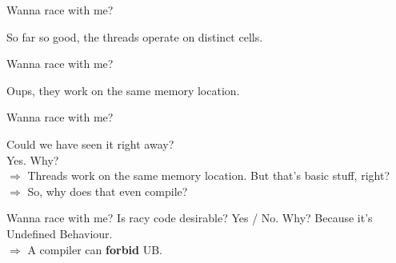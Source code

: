 \documentclass{beamer}
\begin{document}
\begin{frame}{Wanna race with me?}
	\begin{center}
		\vfill
		So far so good, the threads operate on distinct cells.
	\end{center}
\end{frame}


\begin{frame}{Wanna race with me?}
	\begin{center}
		\vfill
		Oups, they work on the same memory location.
	\end{center}
\end{frame}


\begin{frame}{Wanna race with me?}
	\begin{center}
		Could we have seen it right away?\\
		\pause
		Yes.
		\vfill\pause
		Why?\\
		\pause
		$\Rightarrow$ Threads work on the same memory location.
		\vfill\pause
		But that's basic stuff, right?\\
		\pause
		{\color{red} $\Rightarrow$ So, why does that even compile?}
	\end{center}
\end{frame}


\begin{frame}{Wanna race with me?}
	Is racy code desirable?
	{Yes} / {No}.
	\vfill\pause
	Why?
	\pause
	Because it's Undefined Behaviour.\\
	$\Rightarrow$ A compiler can \textbf{forbid} UB.
\end{frame}
\end{document}
